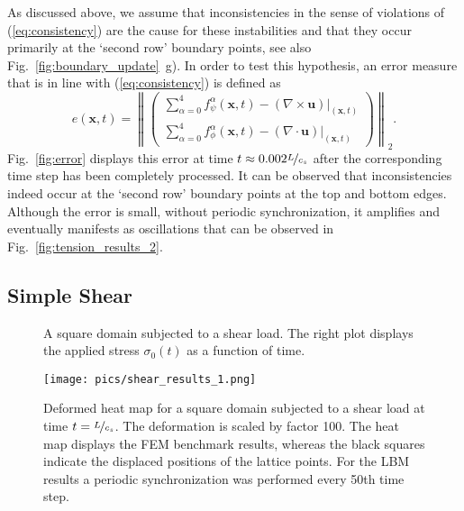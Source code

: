 \documentclass{article}
\renewcommand{\vec}{\boldsymbol}        %
\newcommand{\norm}[1]{\left\lVert#1\right\rVert}
\begin{document}
As discussed above, we assume that inconsistencies in the sense of violations of (\ref{eq:consistency}) are the cause for these instabilities and that they occur primarily at the `second row' boundary points, see also Fig.~\ref{fig:boundary_update}~g). In order to test this hypothesis, an error measure that is in line with (\ref{eq:consistency}) is defined as
\begin{equation}
    e(\boldsymbol{x},t)= \norm{\begin{pmatrix}
     \sum_{\alpha=0}^4 f_{\psi}^{\alpha}(\vec{x},t) - (\nabla\times\vec{u})\vert_{(\vec{x},t)}\\
    \sum_{\alpha=0}^4 f_{\phi}^{\alpha}(\vec{x},t) - (\nabla\cdot{\vec{u}})\vert_{(\vec{x},t)}
    \end{pmatrix}}_2.
\end{equation}
Fig.~\ref{fig:error} displays this error at time $t\approx0.002\nicefrac{L}{c_s}$ after the corresponding time step has been completely processed. It can be observed that inconsistencies indeed occur at the `second row' boundary points at the top and bottom edges. Although the error is small, without periodic synchronization, it amplifies and eventually manifests as oscillations that can be observed in Fig.~\ref{fig:tension_results_2}. 



\subsection{Simple Shear}

\begin{figure*}[htb]
    \centering
     
    \caption{A square domain subjected to a shear load. The right plot displays the applied stress $\sigma_{0}(t)$ as a function of time.}
    \label{fig:shear_setup}
\end{figure*}

\begin{figure}[htb]
    \centering
    \texttt{[image: pics/shear\_results\_1.png]}
    \caption{Deformed heat map for a square domain subjected to a shear load  at time $t=\nicefrac{L}{c_s}$. The deformation is scaled by factor 100. The heat map displays the FEM benchmark results, whereas the black squares indicate the displaced positions of the lattice points. For the LBM results a periodic synchronization was performed every 50th time step.}
    \label{fig:shear_results_1}
\end{figure}
\end{document}
